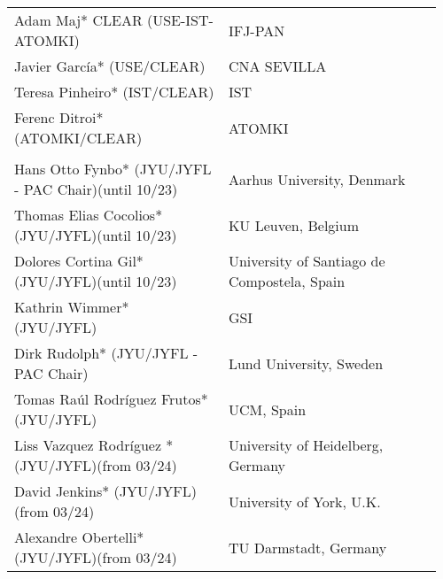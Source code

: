 \begin{longtable}{|L{0.48\linewidth}|C{0.48\linewidth}|}
      \\ \hline
    Adam Maj* CLEAR (USE-IST-ATOMKI)	& IFJ-PAN \\ \hline
    Javier García* (USE/CLEAR)	& CNA SEVILLA \\ \hline
    Teresa Pinheiro* (IST/CLEAR)	& IST \\ \hline
    Ferenc Ditroi* (ATOMKI/CLEAR)	& ATOMKI \\ \hline

      \\ \hline
    Hans Otto Fynbo* (JYU/JYFL - PAC Chair)(until 10/23)	& Aarhus University, Denmark \\ \hline
    Thomas Elias Cocolios* (JYU/JYFL)(until 10/23)	& KU Leuven, Belgium \\ \hline
    Dolores Cortina Gil* (JYU/JYFL)(until 10/23)	& University of Santiago de Compostela, Spain \\ \hline
    Kathrin Wimmer* (JYU/JYFL)	& GSI \\ \hline
    Dirk Rudolph* (JYU/JYFL - PAC Chair)	& Lund University, Sweden \\ \hline
    Tomas Raúl Rodríguez Frutos* (JYU/JYFL)	& UCM, Spain \\ \hline
    Liss Vazquez Rodríguez * (JYU/JYFL)(from 03/24)	& University of Heidelberg, Germany \\ \hline
    David Jenkins* (JYU/JYFL)(from 03/24)	& University of York, U.K. \\ \hline
    Alexandre Obertelli* (JYU/JYFL)(from 03/24)	& TU Darmstadt, Germany \\ %
\end{longtable}

